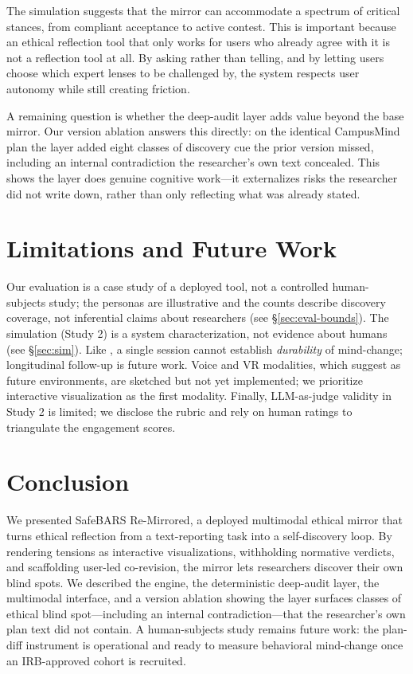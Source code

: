 \documentclass[sigconf,screen]{acmart}
\begin{document}
The simulation suggests that the mirror can accommodate a spectrum of
critical stances, from compliant acceptance to active contest. This is
important because an ethical reflection tool that only works for users who
already agree with it is not a reflection tool at all. By asking rather than
telling, and by letting users choose which expert lenses to be challenged by,
the system respects user autonomy while still creating friction.

A remaining question is whether the deep-audit layer adds value beyond the base
mirror. Our version ablation answers this directly: on the identical CampusMind
plan the layer added eight classes of discovery cue the prior version missed,
including an internal contradiction the researcher's own text concealed. This
shows the layer does genuine cognitive work---it externalizes risks the
researcher did not write down, rather than only reflecting what was already
stated.

\section{Limitations and Future Work}

Our evaluation is a case study of a deployed tool, not a controlled
human-subjects study; the personas are illustrative and the counts describe
discovery coverage, not inferential claims about researchers (see
\S\ref{sec:eval-bounds}). The simulation (Study 2) is a system
characterization, not evidence about humans (see \S\ref{sec:sim}). Like
\citeauthor{taheri26}, a
single session cannot establish \emph{durability} of mind-change; longitudinal
follow-up is future work. Voice and VR modalities, which \citeauthor{taheri26}
suggest as future environments, are sketched but not yet implemented; we
prioritize interactive visualization as the first modality. Finally,
LLM-as-judge validity in Study 2 is limited; we disclose the rubric and rely
on human ratings to triangulate the engagement scores.

\section{Conclusion}

We presented SafeBARS Re-Mirrored, a deployed multimodal ethical mirror that
turns ethical reflection from a text-reporting task into a self-discovery loop.
By rendering tensions as interactive visualizations, withholding normative
verdicts, and scaffolding user-led co-revision, the mirror lets researchers
discover their own blind spots. We described the engine, the deterministic
deep-audit layer, the multimodal interface, and a version ablation showing the
layer surfaces classes of ethical blind spot---including an internal
contradiction---that the researcher's own plan text did not contain. A
human-subjects study remains future work: the plan-diff instrument is
operational and ready to measure behavioral mind-change once an IRB-approved
cohort is recruited.
\end{document}
